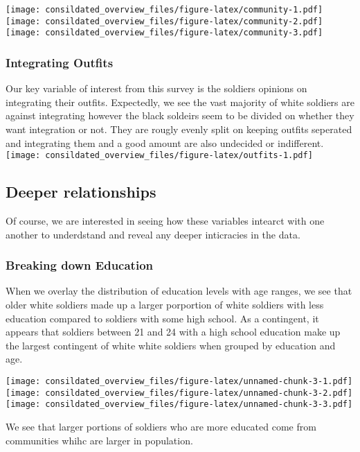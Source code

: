 \documentclass[]{article}
\begin{document}
\texttt{[image: consildated\_overview\_files/figure-latex/community-1.pdf]}
\texttt{[image: consildated\_overview\_files/figure-latex/community-2.pdf]}
\texttt{[image: consildated\_overview\_files/figure-latex/community-3.pdf]}

\subsubsection{Integrating Outfits}\label{integrating-outfits}

Our key variable of interest from this survey is the soldiers opinions
on integrating their outfits. Expectedly, we see the vast majority of
white soldiers are against integrating however the black soldeirs seem
to be divided on whether they want integration or not. They are rougly
evenly split on keeping outfits seperated and integrating them and a
good amount are also undecided or indifferent.
\texttt{[image: consildated\_overview\_files/figure-latex/outfits-1.pdf]}

\subsection{Deeper relationships}\label{deeper-relationships}

Of course, we are interested in seeing how these variables intearct with
one another to underdstand and reveal any deeper inticracies in the
data.

\subsubsection{Breaking down Education}\label{breaking-down-education}

When we overlay the distribution of education levels with age ranges, we
see that older white soldiers made up a larger porportion of white
soldiers with less education compared to soldiers with some high school.
As a contingent, it appears that soldiers between 21 and 24 with a high
school education make up the largest contingent of white white soldiers
when grouped by education and age.

\texttt{[image: consildated\_overview\_files/figure-latex/unnamed-chunk-3-1.pdf]}
\texttt{[image: consildated\_overview\_files/figure-latex/unnamed-chunk-3-2.pdf]}
\texttt{[image: consildated\_overview\_files/figure-latex/unnamed-chunk-3-3.pdf]}

We see that larger portions of soldiers who are more educated come from
communities whihc are larger in population.
\end{document}
